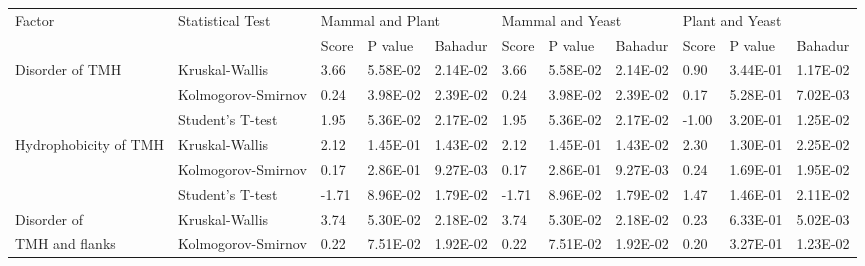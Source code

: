 \begin{table}[htbp]
{\begin{tabular}{lllllllllll}
	\toprule
	\multirow{2}{*}{Factor}                           & \multirow{2}{*}{Statistical Test} & \multicolumn{3}{l}{Mammal and Plant}      & \multicolumn{3}{l}{Mammal and Yeast}      & \multicolumn{3}{l}{Plant and Yeast}       \\
	                                                  &                                   & Score & P value  & Bahadur & Score & P value  & Bahadur & Score & P value  & Bahadur \\
  \midrule
	\multirow{3}{*}{Disorder of TMH}                  & Kruskal-Wallis                    & 3.66           & 5.58E-02 & 2.14E-02      & 3.66           & 5.58E-02 & 2.14E-02      & 0.90           & 3.44E-01 & 1.17E-02      \\
	                                                  & Kolmogorov-Smirnov                & 0.24           & 3.98E-02 & 2.39E-02      & 0.24           & 3.98E-02 & 2.39E-02      & 0.17           & 5.28E-01 & 7.02E-03      \\
	                                                  & Student's T-test                  & 1.95           & 5.36E-02 & 2.17E-02      & 1.95           & 5.36E-02 & 2.17E-02      & -1.00          & 3.20E-01 & 1.25E-02      \\
  \midrule
	\multirow{3}{*}{Hydrophobicity of TMH}            & Kruskal-Wallis                    & 2.12           & 1.45E-01 & 1.43E-02      & 2.12           & 1.45E-01 & 1.43E-02      & 2.30           & 1.30E-01 & 2.25E-02      \\
	                                                  & Kolmogorov-Smirnov                & 0.17           & 2.86E-01 & 9.27E-03      & 0.17           & 2.86E-01 & 9.27E-03      & 0.24           & 1.69E-01 & 1.95E-02      \\
	                                                  & Student's T-test                  & -1.71          & 8.96E-02 & 1.79E-02      & -1.71          & 8.96E-02 & 1.79E-02      & 1.47           & 1.46E-01 & 2.11E-02      \\
  \midrule
	\multirow{1}{*}{Disorder of}								      & Kruskal-Wallis                    & 3.74           & 5.30E-02 & 2.18E-02      & 3.74           & 5.30E-02 & 2.18E-02      & 0.23           & 6.33E-01 & 5.02E-03      \\
	\multirow{2}{*}{TMH and flanks}                   & Kolmogorov-Smirnov                & 0.22           & 7.51E-02 & 1.92E-02      & 0.22           & 7.51E-02 & 1.92E-02      & 0.20           & 3.27E-01 & 1.23E-02      \\

\end{tabular}}
\end{table}
